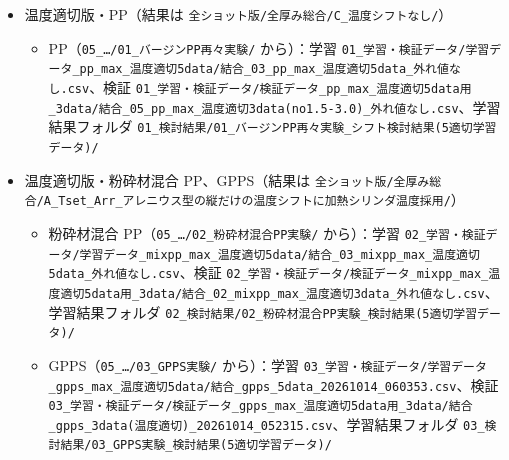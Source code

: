 \documentclass[paper=a4paper,fontsize=10.5pt,line_length=44zw,number_of_lines=40]{jlreq}
\begin{document}
\begin{itemize}[itemsep=0.3ex,topsep=0.4ex]
\begin{itemize}[itemsep=0.1ex,topsep=0.2ex]
\end{itemize}
\item[③] 温度適切版・PP（結果は \texttt{全ショット版/\allowbreak{}全厚み総合/\allowbreak{}C\_\allowbreak{}温度シフトなし/\allowbreak{}}）
\begin{itemize}[itemsep=0.1ex,topsep=0.2ex]
\item PP（\texttt{05\_\allowbreak{}…/\allowbreak{}01\_\allowbreak{}バージンPP再々実験/\allowbreak{}} から）：学習 \texttt{01\_\allowbreak{}学習・検証データ/\allowbreak{}学習データ\_\allowbreak{}pp\_\allowbreak{}max\_\allowbreak{}温度適切5data/\allowbreak{}結合\_\allowbreak{}03\_\allowbreak{}pp\_\allowbreak{}max\_\allowbreak{}温度適切5data\_\allowbreak{}外れ値なし.csv}、検証 \texttt{01\_\allowbreak{}学習・検証データ/\allowbreak{}検証データ\_\allowbreak{}pp\_\allowbreak{}max\_\allowbreak{}温度適切5data用\_\allowbreak{}3data/\allowbreak{}結合\_\allowbreak{}05\_\allowbreak{}pp\_\allowbreak{}max\_\allowbreak{}温度適切3data(no1.5-3.0)\_\allowbreak{}外れ値なし.csv}、学習結果フォルダ \texttt{01\_\allowbreak{}検討結果/\allowbreak{}01\_\allowbreak{}バージンPP再々実験\_\allowbreak{}シフト検討結果(5適切学習データ)/\allowbreak{}}
\end{itemize}
\item[④] 温度適切版・粉砕材混合 PP、GPPS（結果は \texttt{全ショット版/\allowbreak{}全厚み総合/\allowbreak{}A\_\allowbreak{}Tset\_\allowbreak{}Arr\_\allowbreak{}アレニウス型の縦だけの温度シフトに加熱シリンダ温度採用/\allowbreak{}}）
\begin{itemize}[itemsep=0.1ex,topsep=0.2ex]
\item 粉砕材混合 PP（\texttt{05\_\allowbreak{}…/\allowbreak{}02\_\allowbreak{}粉砕材混合PP実験/\allowbreak{}} から）：学習 \texttt{02\_\allowbreak{}学習・検証データ/\allowbreak{}学習データ\_\allowbreak{}mixpp\_\allowbreak{}max\_\allowbreak{}温度適切5data/\allowbreak{}結合\_\allowbreak{}03\_\allowbreak{}mixpp\_\allowbreak{}max\_\allowbreak{}温度適切5data\_\allowbreak{}外れ値なし.csv}、検証 \texttt{02\_\allowbreak{}学習・検証データ/\allowbreak{}検証データ\_\allowbreak{}mixpp\_\allowbreak{}max\_\allowbreak{}温度適切5data用\_\allowbreak{}3data/\allowbreak{}結合\_\allowbreak{}02\_\allowbreak{}mixpp\_\allowbreak{}max\_\allowbreak{}温度適切3data\_\allowbreak{}外れ値なし.csv}、学習結果フォルダ \texttt{02\_\allowbreak{}検討結果/\allowbreak{}02\_\allowbreak{}粉砕材混合PP実験\_\allowbreak{}検討結果(5適切学習データ)/\allowbreak{}}
\item GPPS（\texttt{05\_\allowbreak{}…/\allowbreak{}03\_\allowbreak{}GPPS実験/\allowbreak{}} から）：学習 \texttt{03\_\allowbreak{}学習・検証データ/\allowbreak{}学習データ\_\allowbreak{}gpps\_\allowbreak{}max\_\allowbreak{}温度適切5data/\allowbreak{}結合\_\allowbreak{}gpps\_\allowbreak{}5data\_\allowbreak{}20261014\_\allowbreak{}060353.csv}、検証 \texttt{03\_\allowbreak{}学習・検証データ/\allowbreak{}検証データ\_\allowbreak{}gpps\_\allowbreak{}max\_\allowbreak{}温度適切5data用\_\allowbreak{}3data/\allowbreak{}結合\_\allowbreak{}gpps\_\allowbreak{}3data(温度適切)\_\allowbreak{}20261014\_\allowbreak{}052315.csv}、学習結果フォルダ \texttt{03\_\allowbreak{}検討結果/\allowbreak{}03\_\allowbreak{}GPPS実験\_\allowbreak{}検討結果(5適切学習データ)/\allowbreak{}}

\end{itemize}
\end{itemize}
\end{document}
